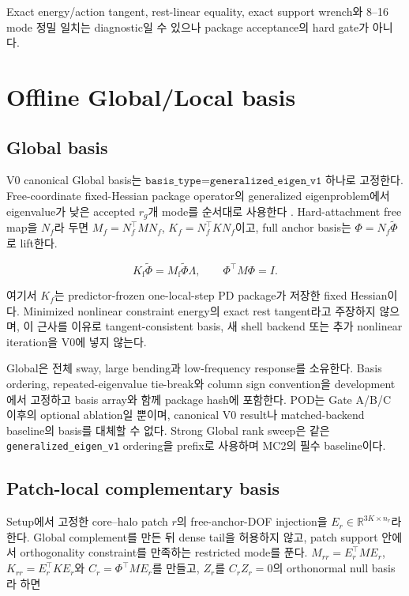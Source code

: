 \documentclass[11pt]{article}
\begin{document}
Exact energy/action tangent, rest-linear equality, exact support wrench와
8--16 mode 정밀 일치는 diagnostic일 수 있으나 package acceptance의 hard gate가 아니다.

\section{Offline Global/Local basis}

\subsection{Global basis}

V0 canonical Global basis는
\(\texttt{basis\_type=generalized\_eigen\_v1}\) 하나로 고정한다.
Free-coordinate fixed-Hessian package operator의 generalized eigenproblem에서 eigenvalue가 낮은
accepted \(r_g\)개 mode를 순서대로 사용한다 \cite{barbic2005stvk,diener2009windbasis}.
Hard-attachment free map을 \(N_f\)라 두면
\(M_f=N_f^\top MN_f\), \(K_f=N_f^\top KN_f\)이고,
full anchor basis는 \(\Phi=N_f\widetilde\Phi\)로 lift한다.

\begin{equation}
  K_{\mathrm f}\widetilde\Phi
  =
  M_{\mathrm f}\widetilde\Phi\Lambda,\qquad
  \Phi^\top M\Phi=I.
  \label{eq:minimal-global-basis}
\end{equation}

여기서 \(K_f\)는 predictor-frozen one-local-step PD package가 저장한 fixed Hessian이다.
Minimized nonlinear constraint energy의 exact rest tangent라고 주장하지 않으며, 이 근사를 이유로
tangent-consistent basis, 새 shell backend 또는 추가 nonlinear iteration을 V0에 넣지 않는다.

Global은 전체 sway, large bending과 low-frequency response를 소유한다.
Basis ordering, repeated-eigenvalue tie-break와 column sign convention을 development에서 고정하고
basis array와 함께 package hash에 포함한다. POD는 Gate A/B/C 이후의 optional ablation일 뿐이며,
canonical V0 result나 matched-backend baseline의 basis를 대체할 수 없다.
Strong Global rank sweep은 같은 \texttt{generalized\_eigen\_v1} ordering을 prefix로 사용하며
MC2의 필수 baseline이다.

\subsection{Patch-local complementary basis}

Setup에서 고정한 core--halo patch \(r\)의 free-anchor-DOF injection을
\(E_r\in\mathbb R^{3K\times n_r}\)라 한다.
Global complement를 만든 뒤 dense tail을 허용하지 않고,
patch support 안에서 orthogonality constraint를 만족하는 restricted mode를 푼다.
\(M_{rr}=E_r^\top ME_r\), \(K_{rr}=E_r^\top KE_r\)와
\(C_r=\Phi^\top ME_r\)를 만들고, \(Z_r\)를 \(C_rZ_r=0\)의 orthonormal null basis라 하면
\end{document}
